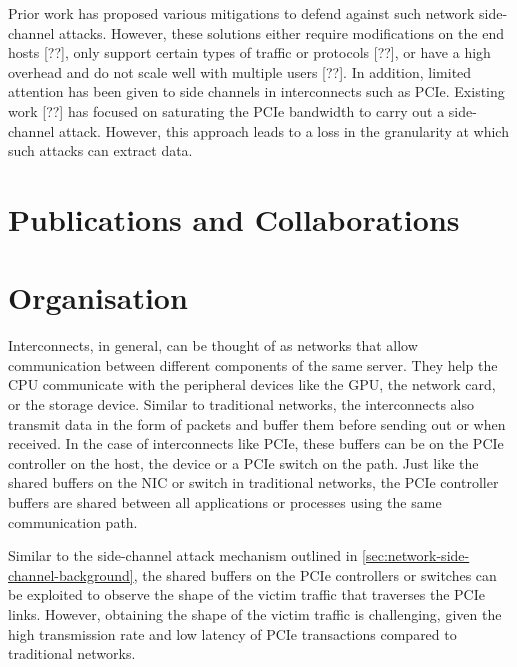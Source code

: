 Prior work has proposed various mitigations to defend against such network side-channel attacks. However, these solutions either require modifications on the end hosts [??], %
only support certain types of traffic or protocols [??], %
or have a high overhead and do not scale well with multiple users [??]. %
In addition, limited attention has been given to side channels in interconnects such as PCIe. 
Existing work [??] has focused on saturating the PCIe bandwidth to carry out a side-channel attack. However, this approach leads to a loss in the granularity at which such attacks can extract data.


\section{Publications and Collaborations}\label{sec:collabs}
\section{Organisation}\label{sec:org}

Interconnects, in general, can be thought of as networks that allow communication between different components of the same server. 
They help the CPU communicate with the peripheral devices like the GPU, the network card, or the storage device. 
Similar to traditional networks, the interconnects also transmit data in the form of packets and buffer them before sending out or when received.
In the case of interconnects like PCIe, these buffers can be on the PCIe controller on the host, the device or a PCIe switch on the path.
Just like the shared buffers on the NIC or switch in traditional networks, the PCIe controller buffers are shared between all applications or processes using the same communication path.

Similar to the side-channel attack mechanism outlined in \ref{sec:network-side-channel-background}, the shared buffers on the PCIe controllers or switches can be exploited to observe the shape of the victim traffic that traverses the PCIe links.
However, obtaining the shape of the victim traffic is challenging, given the high transmission rate and low latency of PCIe transactions compared to traditional networks.

\endinput

